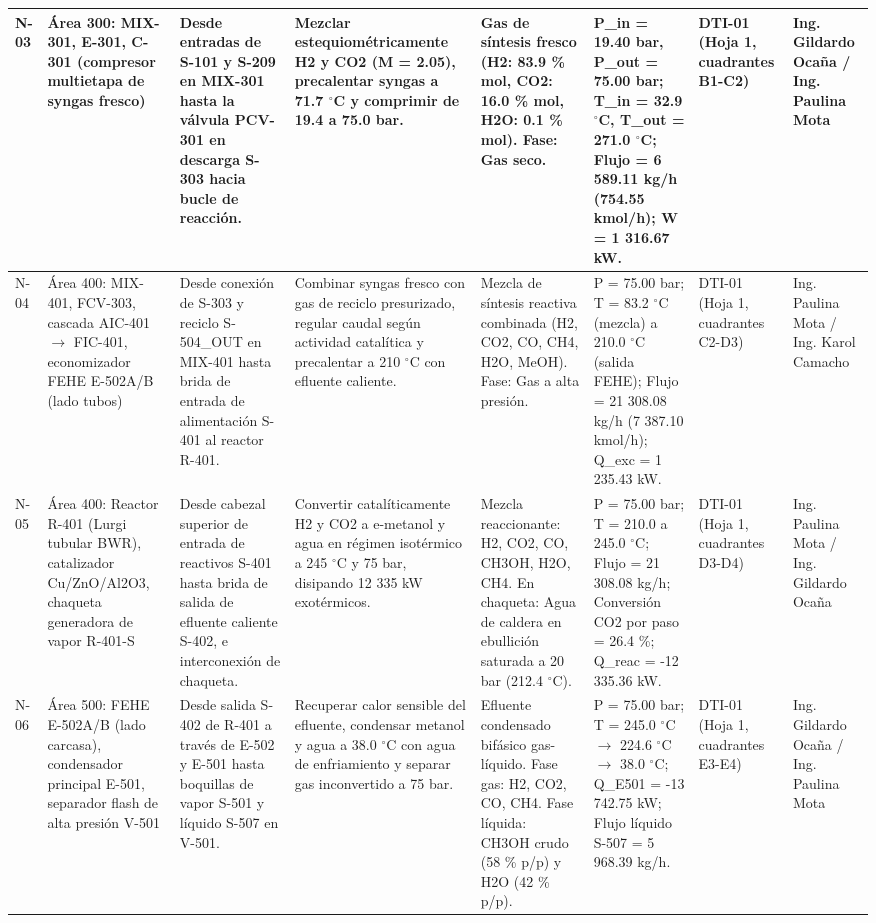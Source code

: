 \documentclass[10pt,letterpaper]{article}
\begin{document}
\begin{landscape}
\begin{xltabular}{\linewidth}{|l|p{2.4cm}|p{2.6cm}|>{\raggedright\arraybackslash}X|p{2.2cm}|p{2.4cm}|p{1.6cm}|p{2.2cm}|}
N-03 & Área 300: MIX-301, E-301, C-301 (compresor multietapa de syngas fresco) & Desde entradas de S-101 y S-209 en MIX-301 hasta la válvula PCV-301 en descarga S-303 hacia bucle de reacción. & Mezclar estequiométricamente H2 y CO2 (M = 2.05), precalentar syngas a 71.7 $^\circ$C y comprimir de 19.4 a 75.0 bar. & Gas de síntesis fresco (H2: 83.9 \% mol, CO2: 16.0 \% mol, H2O: 0.1 \% mol). Fase: Gas seco. & P\_\allowbreak in = 19.40 bar, P\_\allowbreak out = 75.00 bar; T\_\allowbreak in = 32.9 $^\circ$C, T\_\allowbreak out = 271.0 $^\circ$C; Flujo = 6 589.11 kg/h (754.55 kmol/h); W = 1 316.67 kW. & DTI-01 (Hoja 1, cuadrantes B1-C2) & Ing. Gildardo Ocaña / Ing. Paulina Mota \\ \hline
N-04 & Área 400: MIX-401, FCV-303, cascada AIC-401 $\to$ FIC-401, economizador FEHE E-502A/B (lado tubos) & Desde conexión de S-303 y reciclo S-504\_\allowbreak OUT en MIX-401 hasta brida de entrada de alimentación S-401 al reactor R-401. & Combinar syngas fresco con gas de reciclo presurizado, regular caudal según actividad catalítica y precalentar a 210 $^\circ$C con efluente caliente. & Mezcla de síntesis reactiva combinada (H2, CO2, CO, CH4, H2O, MeOH). Fase: Gas a alta presión. & P = 75.00 bar; T = 83.2 $^\circ$C (mezcla) a 210.0 $^\circ$C (salida FEHE); Flujo = 21 308.08 kg/h (7 387.10 kmol/h); Q\_\allowbreak exc = 1 235.43 kW. & DTI-01 (Hoja 1, cuadrantes C2-D3) & Ing. Paulina Mota / Ing. Karol Camacho \\ \hline
N-05 & Área 400: Reactor R-401 (Lurgi tubular BWR), catalizador Cu/ZnO/Al2O3, chaqueta generadora de vapor R-401-S & Desde cabezal superior de entrada de reactivos S-401 hasta brida de salida de efluente caliente S-402, e interconexión de chaqueta. & Convertir catalíticamente H2 y CO2 a e-metanol y agua en régimen isotérmico a 245 $^\circ$C y 75 bar, disipando 12 335 kW exotérmicos. & Mezcla reaccionante: H2, CO2, CO, CH3OH, H2O, CH4. En chaqueta: Agua de caldera en ebullición saturada a 20 bar (212.4 $^\circ$C). & P = 75.00 bar; T = 210.0 a 245.0 $^\circ$C; Flujo = 21 308.08 kg/h; Conversión CO2 por paso = 26.4 \%; Q\_\allowbreak reac = -12 335.36 kW. & DTI-01 (Hoja 1, cuadrantes D3-D4) & Ing. Paulina Mota / Ing. Gildardo Ocaña \\ \hline
N-06 & Área 500: FEHE E-502A/B (lado carcasa), condensador principal E-501, separador flash de alta presión V-501 & Desde salida S-402 de R-401 a través de E-502 y E-501 hasta boquillas de vapor S-501 y líquido S-507 en V-501. & Recuperar calor sensible del efluente, condensar metanol y agua a 38.0 $^\circ$C con agua de enfriamiento y separar gas inconvertido a 75 bar. & Efluente condensado bifásico gas-líquido. Fase gas: H2, CO2, CO, CH4. Fase líquida: CH3OH crudo (58 \% p/p) y H2O (42 \% p/p). & P = 75.00 bar; T = 245.0 $^\circ$C $\to$ 224.6 $^\circ$C $\to$ 38.0 $^\circ$C; Q\_\allowbreak E501 = -13 742.75 kW; Flujo líquido S-507 = 5 968.39 kg/h. & DTI-01 (Hoja 1, cuadrantes E3-E4) & Ing. Gildardo Ocaña / Ing. Paulina Mota \\ \hline

\end{xltabular}
\end{landscape}
\end{document}
